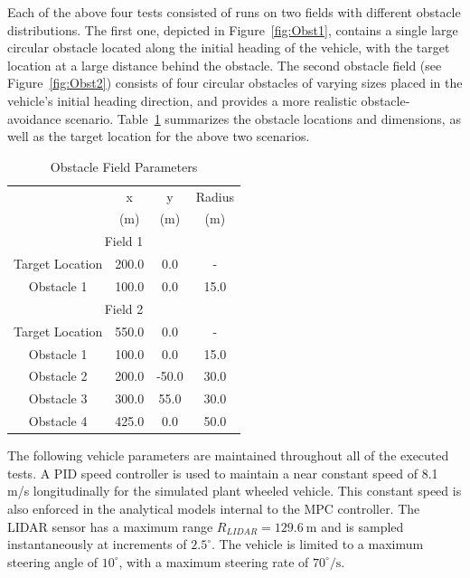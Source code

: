 \documentclass[12pt,onecolumn]{report}
\newcommand{\CHRONO}{{\sffamily{{Chrono}}}}
\begin{document}
Each of the above four tests consisted of runs on two fields with different obstacle distributions. 
The first one, depicted in Figure~\ref{fig:Obst1}, contains a single large circular obstacle located along the initial heading of the vehicle, with the target location at a large distance behind the obstacle. 
The second obstacle field (see Figure~\ref{fig:Obst2}) consists of four circular obstacles of varying sizes placed in the vehicle's initial heading direction, and provides a more realistic obstacle-avoidance scenario.
Table~\ref{t:ObstSummary} summarizes the obstacle locations and dimensions, as well as the target location for the above two scenarios.

\begin{table}
	\begin{center}
		\begin{tabular}{||c|c|c|c||} 
			
			\hline
			& x & y & Radius\\
			& (m) & (m) & (m)\\
			\hline\hline
			\multicolumn{4}{||c||}{Field 1} \\
			\hline
			Target Location  & 200.0 & 0.0 & -\\ 
			\hline
			Obstacle 1 & 100.0 & 0.0 & 15.0\\			
			\hline\hline
			\multicolumn{4}{||c||}{Field 2} \\
			\hline
			Target Location  & 550.0 & 0.0 & -\\ 
			\hline
			Obstacle 1 & 100.0 & 0.0 & 15.0\\
			\hline
			Obstacle 2 & 200.0 & -50.0 & 30.0\\
			\hline
			Obstacle 3 & 300.0 & 55.0 & 30.0\\
			\hline
			Obstacle 4 & 425.0 & 0.0 & 50.0\\
			\hline
		\end{tabular}
	\end{center}
	\caption{Obstacle Field Parameters}
	\label{t:ObstSummary}
\end{table}

The following vehicle parameters are maintained throughout all of the executed tests. A PID speed controller is used to maintain a near constant speed of 8.1 m/s longitudinally for the simulated plant {\CHRONO} wheeled vehicle. This constant speed is also enforced in the analytical models internal to the MPC controller. The LIDAR sensor has a maximum range $R_{LIDAR} = 129.6~\text{m}$ and is sampled instantaneously at increments of $2.5^\circ$. The vehicle is limited to a maximum steering angle of $10^\circ$, with a maximum steering rate of $70^{\circ}/\text{s}$. 
\end{document}
